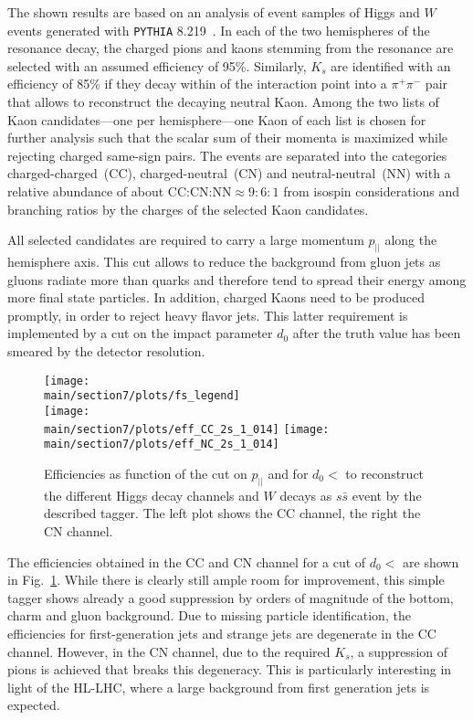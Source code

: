 \documentclass[../report.tex]{subfiles}
\providecommand{\main}{..}
\begin{document}
The shown results are based on an analysis of event samples of Higgs and $W$ events generated with
\texttt{PYTHIA} 8.219~\cite{Sjostrand:2006za, Sjostrand:2014zea}. In each of the two hemispheres of the resonance decay, the charged pions and kaons stemming from the resonance are selected with an
assumed efficiency of 95\%. Similarly, $K_s$ are identified with an efficiency of 85\% if they decay
within  of the interaction point into a $\pi^+\pi^-$ pair that allows to reconstruct
the decaying neutral Kaon. Among the two lists of Kaon candidates---one per hemisphere---one Kaon of
each list is chosen for further analysis such that the scalar sum of their momenta is maximized
while rejecting charged same-sign pairs. The events are separated into the categories
charged-charged~(CC), charged-neutral~(CN) and neutral-neutral~(NN) with a relative abundance of about CC:CN:NN$\approx 9:6:1$ from isospin considerations and branching ratios by the charges of the selected Kaon candidates.

All selected candidates are required to carry a large momentum $p_{||}$ along the hemisphere
axis. This cut allows to reduce the background from gluon jets as gluons radiate more than quarks
and therefore tend to spread their energy among more final state particles. In addition, charged Kaons need to be produced promptly, in order to reject heavy flavor jets. This latter requirement is implemented by a cut on the impact parameter $d_0$ after the truth value has been smeared by the detector resolution.
\begin{figure}[t]
  \centering
  \texttt{[image: \\main/section7/plots/fs\_legend]}\\
  \texttt{[image: \\main/section7/plots/eff\_CC\_2s\_1\_014]}
  \texttt{[image: \\main/section7/plots/eff\_NC\_2s\_1\_014]}
  \caption{Efficiencies as function of the cut on $p_{||}$ and for $d_0<$ to
    reconstruct the different Higgs decay channels and $W$ decays as $s\bar s$ event by the
    described tagger. The left plot shows the CC channel, the right the CN channel.}
  \label{fig:stagger-efficiencies}
\end{figure}

The efficiencies obtained in the CC and CN channel for a cut of $d_0<$ are shown in
Fig.~\ref{fig:stagger-efficiencies}. While there is clearly still ample room for improvement, this
simple tagger shows already a good suppression by orders of magnitude of the bottom, charm and gluon
background. Due to missing particle identification, the efficiencies for first-generation jets and
strange jets are degenerate in the CC channel. However, in the CN channel, due to the required
$K_s$, a suppression of pions is achieved that breaks this degeneracy. This is particularly
interesting in light of the HL-LHC, where a large background from first generation jets is expected.
\end{document}
